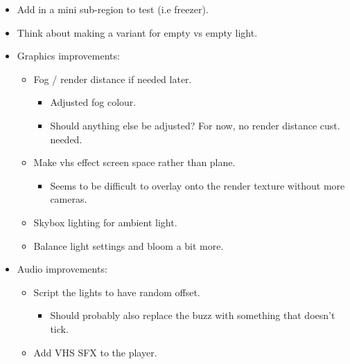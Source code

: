 \begin{itemize}
          \begin{itemize}
              \item Add in a mini sub-region to test (i.e freezer).
              \item Think about making a variant for empty vs empty light.
              \item Graphics improvements:
                    \begin{itemize}
                        \item Fog / render distance if needed later.
                              \begin{itemize}
                                  \item Adjusted fog colour.
                                  \item Should anything else be adjusted? For now, no render distance cust. needed.
                              \end{itemize}
                        \item Make vhs effect screen space rather than plane.
                              \begin{itemize}
                                  \item Seems to be difficult to overlay onto the render texture without more cameras.
                              \end{itemize}
                        \item Skybox lighting for ambient light.
                        \item Balance light settings and bloom a bit more.
                    \end{itemize}
              \item Audio improvements:
                    \begin{itemize}
                        \item Script the lights to have random offset.
                              \begin{itemize}
                                  \item Should probably also replace the buzz with something that doesn’t tick.
                              \end{itemize}
                        \item Add VHS SFX to the player.
                    \end{itemize}
          \end{itemize}
\end{itemize}

